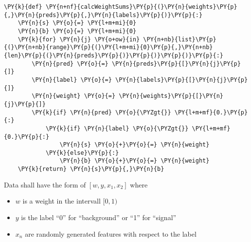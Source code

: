 {\par%
\vspace{-1\baselineskip}%
}%
\begin{notebookcell}[]%
\begin{addmargin}[\cellleftmargin]{0em}%
{\smaller%
\par%
%
\vspace{-1\smallerfontscale}%
\begin{Verbatim}[commandchars=\\\{\}]
\PY{k}{def} \PY{n+nf}{calcWeightSums}\PY{p}{(}\PY{n}{weights}\PY{p}{,}\PY{n}{preds}\PY{p}{,}\PY{n}{labels}\PY{p}{)}\PY{p}{:}
    \PY{n}{s} \PY{o}{=} \PY{l+m+mi}{0}
    \PY{n}{b} \PY{o}{=} \PY{l+m+mi}{0}
    \PY{k}{for} \PY{n}{j} \PY{o+ow}{in} \PY{n+nb}{list}\PY{p}{(}\PY{n+nb}{range}\PY{p}{(}\PY{l+m+mi}{0}\PY{p}{,}\PY{n+nb}{len}\PY{p}{(}\PY{n}{preds}\PY{p}{)}\PY{p}{)}\PY{p}{)}\PY{p}{:}
        \PY{n}{pred} \PY{o}{=} \PY{n}{preds}\PY{p}{[}\PY{n}{j}\PY{p}{]}
        \PY{n}{label} \PY{o}{=} \PY{n}{labels}\PY{p}{[}\PY{n}{j}\PY{p}{]}
        \PY{n}{weight} \PY{o}{=} \PY{n}{weights}\PY{p}{[}\PY{n}{j}\PY{p}{]}
        \PY{k}{if} \PY{n}{pred} \PY{o}{\PYZgt{}} \PY{l+m+mf}{0.}\PY{p}{:}
            \PY{k}{if} \PY{n}{label} \PY{o}{\PYZgt{}} \PY{l+m+mf}{0.}\PY{p}{:}
                \PY{n}{s} \PY{o}{+}\PY{o}{=} \PY{n}{weight}
            \PY{k}{else}\PY{p}{:}
                \PY{n}{b} \PY{o}{+}\PY{o}{=} \PY{n}{weight}
    \PY{k}{return} \PY{n}{s}\PY{p}{,}\PY{n}{b}
\end{Verbatim}
%
\par%
\vspace{-1\smallerfontscale}}%
\end{addmargin}
\end{notebookcell}


    Data shall have the form of \([w,y,x_1,x_2]\) where

\begin{itemize}
\tightlist
\item
  \(w\) is a weight in the intervall \([0,1)\)
\item
  \(y\) is the label ``0'' for ``background'' or ``1'' for ``signal''
\item
  \(x_n\) are randomly generated features with respect to the label
\end{itemize}


